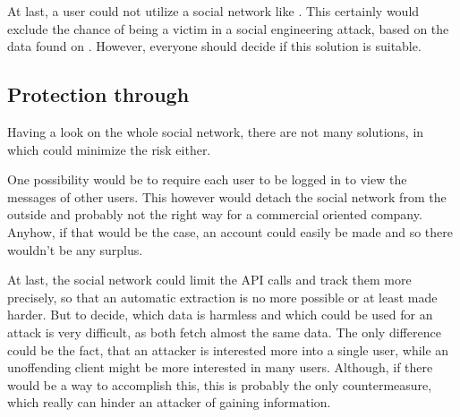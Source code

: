 At last, a user could not utilize a social network like \Twitter{}. This certainly
would exclude the chance of being a victim in a social engineering attack,
based on the data found on \Twitter{}. However, everyone should decide if this
solution is suitable.


\subsection{Protection through \Twitter{}}

Having a look on the whole social network, there are not many solutions, in
which \Twitter{} could minimize the risk either.

One possibility would be to require each user to be logged in to view the
messages of other users. This however would detach the \Twitter{} social
network from the outside and probably not the right way for a commercial
oriented company. Anyhow, if that would be the case, an account could easily be
made and so there wouldn't be any surplus.

At last, the social network could limit the API calls and track them more
precisely, so that an automatic extraction is no more possible or at least made
harder. But to decide, which data is harmless and which could be used for an
attack is very difficult, as both fetch almost the same data. The only
difference could be the fact, that an attacker is interested more into a single
user, while an unoffending \Twitter{} client might be more interested in many
users. Although, if there would be a way to accomplish this, this is probably
the only countermeasure, which really can hinder an attacker of gaining
information.
